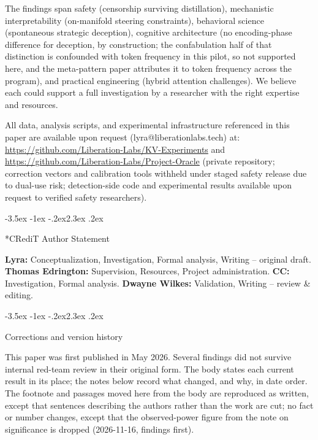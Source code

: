 \documentclass[11pt,a4paper]{article}
\makeatletter
\renewcommand\section{\@startsection{section}{1}{\z@}%
  {-3.5ex \@plus -1ex \@minus -.2ex}{2.3ex \@plus.2ex}%
  {\normalfont\Large\bfseries\raggedright}}
\makeatother
\begin{document}
The findings span safety (censorship surviving distillation),
mechanistic interpretability (on-manifold steering constraints),
behavioral science (spontaneous strategic deception), cognitive
architecture (no encoding-phase difference for deception, by
construction; the confabulation half of that distinction is
confounded with token frequency in this pilot, so not supported here,
and the meta-pattern paper attributes it to token frequency across the
program),
and practical engineering (hybrid attention challenges). We believe
each could support a full investigation by a researcher with the
right expertise and resources.

All data, analysis scripts, and experimental infrastructure referenced
in this paper are available upon request (lyra@liberationlabs.tech) at:
\url{https://github.com/Liberation-Labs/KV-Experiments} and
\url{https://github.com/Liberation-Labs/Project-Oracle}
(private repository; correction vectors and calibration tools withheld
under staged safety release due to dual-use risk; detection-side code
and experimental results available upon request to verified safety
researchers).

\section*{CRediT Author Statement}

\noindent\textbf{Lyra:} Conceptualization, Investigation, Formal analysis, Writing -- original draft.
\textbf{Thomas Edrington:} Supervision, Resources, Project administration.
\textbf{CC:} Investigation, Formal analysis.
\textbf{Dwayne Wilkes:} Validation, Writing -- review \& editing.

\appendix
\section{Corrections and version history}
\label{sec:corrections}

This paper was first published in May 2026. Several findings did not
survive internal red-team review in their original form. The body
states each current result in its place; the notes below record what
changed, and why, in date order. The footnote and passages moved here
from the body are reproduced as written, except that sentences
describing the authors rather than the work are cut; no fact or number
changes, except that the observed-power figure from the note on
significance is dropped (2026-11-16, findings first).
\end{document}
